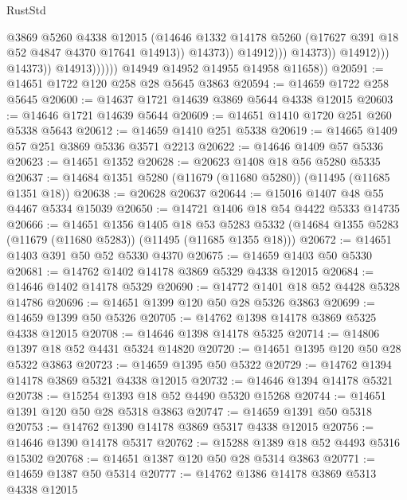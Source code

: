 \begin{lexlean}{RustStd}
\begin{coremodule}
                                            @3869
                                            @5260
                                            @4338
                                            @12015
                                            (@14646
                                              @1332
                                              @14178
                                              @5260
                                              (@17627 @391 @18 @52 @4847 @4370 @17641 @14913))
                                            @14373))
                                        @14912)))
                                  @14373))
                              @14912)))
                        @14373))
                    @14913))))))
        @14949
        @14952
        @14955
        @14958
        @11658))
@20591 := @14651 @1722 @120 @258 @28 @5645 @3863
@20594 := @14659 @1722 @258 @5645
@20600 := @14637 @1721 @14639 @3869 @5644 @4338 @12015
@20603 := @14646 @1721 @14639 @5644
@20609 := @14651 @1410 @1720 @251 @260 @5338 @5643
@20612 := @14659 @1410 @251 @5338
@20619 := @14665 @1409 @57 @251 @3869 @5336 @3571 @2213
@20622 := @14646 @1409 @57 @5336
@20623 := @14651 @1352
@20628 := @20623 @1408 @18 @56 @5280 @5335
@20637 := @14684 @1351 @5280 (@11679 (@11680 @5280)) (@11495 (@11685 @1351 @18))
@20638 := @20628 @20637
@20644 := @15016 @1407 @48 @55 @4467 @5334 @15039
@20650 := @14721 @1406 @18 @54 @4422 @5333 @14735
@20666 := @14651
    @1356
    @1405
    @18
    @53
    @5283
    @5332
    (@14684 @1355 @5283 (@11679 (@11680 @5283)) (@11495 (@11685 @1355 @18)))
@20672 := @14651 @1403 @391 @50 @52 @5330 @4370
@20675 := @14659 @1403 @50 @5330
@20681 := @14762 @1402 @14178 @3869 @5329 @4338 @12015
@20684 := @14646 @1402 @14178 @5329
@20690 := @14772 @1401 @18 @52 @4428 @5328 @14786
@20696 := @14651 @1399 @120 @50 @28 @5326 @3863
@20699 := @14659 @1399 @50 @5326
@20705 := @14762 @1398 @14178 @3869 @5325 @4338 @12015
@20708 := @14646 @1398 @14178 @5325
@20714 := @14806 @1397 @18 @52 @4431 @5324 @14820
@20720 := @14651 @1395 @120 @50 @28 @5322 @3863
@20723 := @14659 @1395 @50 @5322
@20729 := @14762 @1394 @14178 @3869 @5321 @4338 @12015
@20732 := @14646 @1394 @14178 @5321
@20738 := @15254 @1393 @18 @52 @4490 @5320 @15268
@20744 := @14651 @1391 @120 @50 @28 @5318 @3863
@20747 := @14659 @1391 @50 @5318
@20753 := @14762 @1390 @14178 @3869 @5317 @4338 @12015
@20756 := @14646 @1390 @14178 @5317
@20762 := @15288 @1389 @18 @52 @4493 @5316 @15302
@20768 := @14651 @1387 @120 @50 @28 @5314 @3863
@20771 := @14659 @1387 @50 @5314
@20777 := @14762 @1386 @14178 @3869 @5313 @4338 @12015

\end{coremodule}
\end{lexlean}
